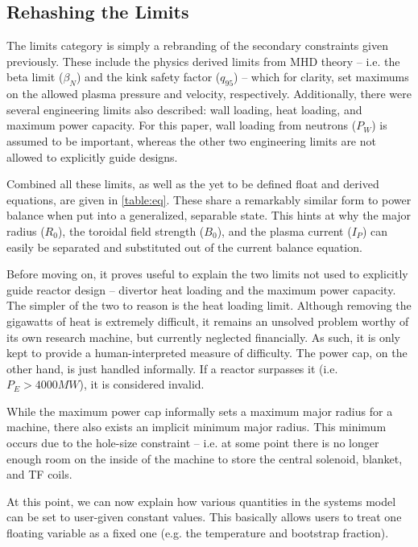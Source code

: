 \subsection{Rehashing the Limits}

The limits category is simply a rebranding of the secondary constraints given previously. These include the physics derived limits from MHD theory -- i.e. the beta limit ($\beta_N$) and the kink safety factor ($q_{95}$) -- which for clarity, set maximums on the allowed plasma pressure and velocity, respectively. Additionally, there were several engineering limits also described: wall loading, heat loading, and maximum power capacity. For this paper, wall loading from neutrons ($P_W$) is assumed to be important, whereas the other two engineering limits are not allowed to explicitly guide designs.

Combined all these limits, as well as the yet to be defined float and derived equations, are given in \cref{table:eq}. These share a remarkably similar form to power balance when put into a generalized, separable state. This hints at why the major radius ($R_0$), the toroidal field strength ($B_0$), and the plasma current ($I_P$) can easily be separated and substituted out of the current balance equation.

Before moving on, it proves useful to explain the two limits not used to explicitly guide reactor design -- divertor heat loading and the maximum power capacity. The simpler of the two to reason is the heat loading limit. Although removing the gigawatts of heat is extremely difficult, it remains an unsolved problem worthy of its own research machine, but currently neglected financially. As such, it is only kept to provide a human-interpreted  measure of difficulty. The power cap, on the other hand, is just handled informally. If a reactor surpasses it (i.e. $ P_E > 4000 MW $), it is considered invalid.

While the maximum power cap informally sets a maximum major radius for a machine, there also exists an implicit minimum major radius. This minimum occurs due to the hole-size constraint -- i.e. at some point there is no longer enough room on the inside of the machine to store the central solenoid, blanket, and TF coils.

At this point, we can now explain how various quantities in the systems model can be set to user-given constant values. This basically allows users to treat one floating variable as a fixed one (e.g. the temperature and bootstrap fraction).

